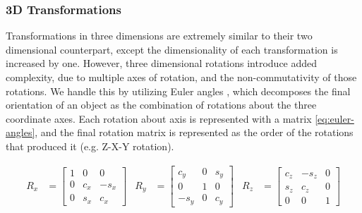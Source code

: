 \subsubsection{3D Transformations}
\label{sec:3d-transformations}
Transformations in three dimensions are extremely similar to their two dimensional counterpart, except the dimensionality of each transformation is increased by one. However, three dimensional rotations introduce added complexity, due to multiple axes of rotation, and the non-commutativity of those rotations. We handle this by utilizing Euler angles \cite{groodJointCoordinateSystem1983}, which decomposes the final orientation of an object as the combination of rotations about the three coordinate axes. Each rotation about axis is represented with a matrix \cref{eq:euler-angles}, and the final rotation matrix is represented as the order of the rotations that produced it (e.g. Z-X-Y rotation). 


\begin{equation}
    \begin{aligned}
        R_{x} &= \begin{bmatrix}
            1 & 0 & 0 \\ 0 & c_x & -s_x \\ 0 & s_x & c_x
        \end{bmatrix}
        &R_{y} &= \begin{bmatrix}
            c_y & 0 & s_y \\ 0 & 1 & 0 \\ -s_y & 0 & c_y
        \end{bmatrix}
        &R_{z} &= \begin{bmatrix}
            c_z & -s_z & 0 \\ s_z & c_z & 0 \\ 0 & 0 & 1
        \end{bmatrix} \\
    \end{aligned}
    \label{eq:euler-angles}
\end{equation}

